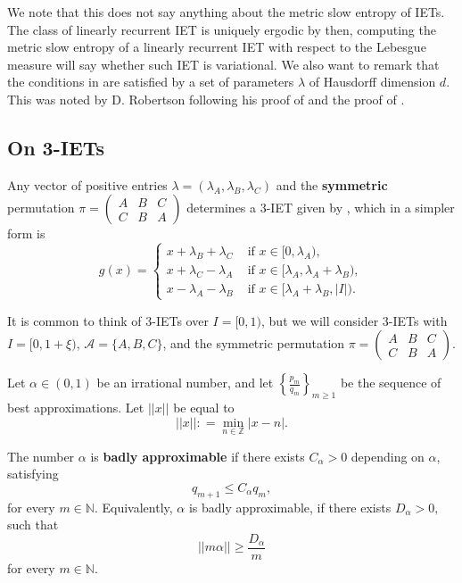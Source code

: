 \documentclass[oneside]{amsart}
\theoremstyle{plain}
\theoremstyle{definition}
\newcommand{\dfn}{\mathrel{\mathop:}=}
\newcommand{\<}{\langle}
\renewcommand{\>}{\rangle}
\newcommand{\A}{\mathcal{A}}
\renewcommand{\|}{|\!|} %
\begin{document}
We note that this does not say anything about the metric slow entropy of IETs. The class of linearly recurrent IET is uniquely ergodic by \cite[Theorem 1.2]{BoshernitzanCond}
then, computing the metric slow entropy of a linearly recurrent IET with respect to the Lebesgue measure will say whether such IET is variational. 
We also want to remark that the conditions in  are satisfied by a set of parameters $\lambda$ of Hausdorff dimension $d$. This was noted by D. Robertson following his proof of \cite[Proposition 4]{ROBERTSON_2019} and the proof of \cite[Theorem 1.4]{JonChaika}.

\subsection{On 3-IETs}
 Any vector of positive entries $\lambda = (\lambda_A,\lambda_B,\lambda_C)$ and the {\bf symmetric} permutation $\pi=\begin{pmatrix}
    A & B & C\\
    C & B & A
\end{pmatrix}$ determines a 3-IET given by , which in a simpler form is
\begin{equation*}
    g(x) = \left\{\begin{array}{ll}
        x+ \lambda_B+\lambda_C & \text{ if }x\in [0,\lambda_A),   \\
         x +\lambda_C -\lambda_A& \text{ if }x\in [\lambda_A,\lambda_A+\lambda_B),\\
         x-\lambda_A -\lambda_B & \text{ if }x\in [\lambda_A+\lambda_B,|I|).
    \end{array} \right.
\end{equation*}



It is common to think of 3-IETs over $I=[0,1)$, but we will consider 3-IETs with $I= [0,1 + \xi)$, $\A=\{A,B,C\}$, and the symmetric permutation $\pi=\begin{pmatrix}
    A & B & C\\
    C & B & A
\end{pmatrix}$. 


Let  $\alpha\in (0,1)$ be an irrational number, and let $\left\{\frac{p_m}{q_m}\right\}_{m\geq 1}$ be the sequence of best approximations. Let $\| x \|$ be equal to $$\|x\| \dfn \min_{n \in \mathbb{Z}} |x - n |.$$ 

The number \(\alpha\) is {\bf badly approximable} if there exists \(C_{\alpha}>0\) depending on $\alpha$, satisfying 
\[q_{m+1}\leq C_{\alpha}q_m,\] 
for every \(m\in \mathbb{N}.\) 
Equivalently, $\alpha$ is badly approximable, if there exists $D_{\alpha}>0,$ such that 
\[\|m\alpha\|\geq \frac{D_\alpha}{m}\]
for every \(m\in \mathbb{N}.\) 
\end{document}

